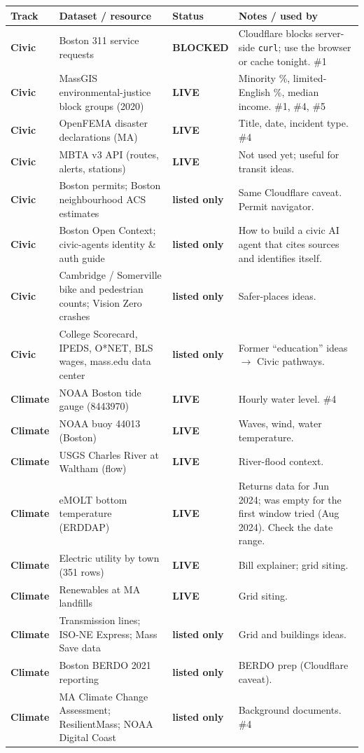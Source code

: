 \documentclass[11pt]{article}
\newcommand{\LIVE}{\textcolor{okgreen}{\textbf{LIVE}}}
\newcommand{\BLOCKED}{\textcolor{warnorange}{\textbf{BLOCKED}}}
\newcommand{\LISTED}{\textcolor{greyish}{\textbf{listed only}}}
\newcommand{\tagC}{\textcolor{civic}{\textbf{Civic}}}
\newcommand{\tagE}{\textcolor{clim}{\textbf{Climate}}}
\begin{document}
\begin{longtable}{@{}L{1.5cm} L{5.0cm} L{2.0cm} L{6.6cm}@{}}
\toprule
\textbf{Track} & \textbf{Dataset / resource} & \textbf{Status} & \textbf{Notes / used by}\\
\midrule
\endhead
\tagC & Boston 311 service requests & \BLOCKED & Cloudflare blocks server-side \texttt{curl}; use the browser or cache tonight. \#1\\
\tagC & MassGIS environmental-justice block groups (2020) & \LIVE & Minority \%, limited-English \%, median income. \#1, \#4, \#5\\
\tagC & OpenFEMA disaster declarations (MA) & \LIVE & Title, date, incident type. \#4\\
\tagC & MBTA v3 API (routes, alerts, stations) & \LIVE & Not used yet; useful for transit ideas.\\
\tagC & Boston permits; Boston neighbourhood ACS estimates & \LISTED & Same Cloudflare caveat. Permit navigator.\\
\tagC & Boston Open Context; civic-agents identity \& auth guide & \LISTED & How to build a civic AI agent that cites sources and identifies itself.\\
\tagC & Cambridge / Somerville bike and pedestrian counts; Vision Zero crashes & \LISTED & Safer-places ideas.\\
\tagC & College Scorecard, IPEDS, O*NET, BLS wages, mass.edu data center & \LISTED & Former ``education'' ideas $\rightarrow$ Civic pathways.\\
\midrule
\tagE & NOAA Boston tide gauge (8443970) & \LIVE & Hourly water level. \#4\\
\tagE & NOAA buoy 44013 (Boston) & \LIVE & Waves, wind, water temperature.\\
\tagE & USGS Charles River at Waltham (flow) & \LIVE & River-flood context.\\
\tagE & eMOLT bottom temperature (ERDDAP) & \LIVE & Returns data for Jun 2024; was empty for the first window tried (Aug 2024). Check the date range.\\
\tagE & Electric utility by town (351 rows) & \LIVE & Bill explainer; grid siting.\\
\tagE & Renewables at MA landfills & \LIVE & Grid siting.\\
\tagE & Transmission lines; ISO-NE Express; Mass Save data & \LISTED & Grid and buildings ideas.\\
\tagE & Boston BERDO 2021 reporting & \LISTED & BERDO prep (Cloudflare caveat).\\
\tagE & MA Climate Change Assessment; ResilientMass; NOAA Digital Coast & \LISTED & Background documents. \#4\\

\end{longtable}
\end{document}
